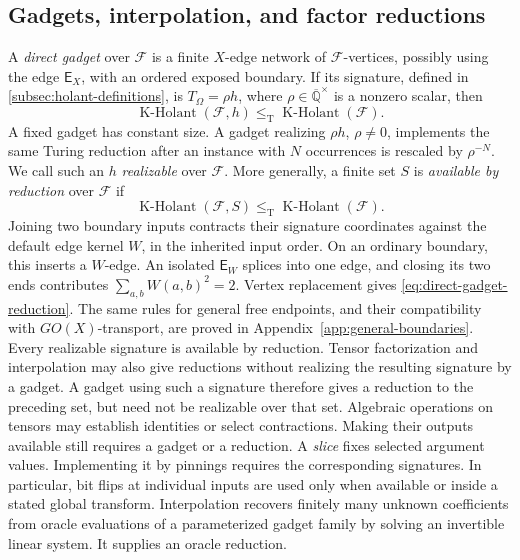 \documentclass[11pt,letterpaper,onecolumn]{article}
\theoremstyle{plain}
\theoremstyle{definition}
\theoremstyle{remark}
\newcommand{\AlgNums}{\overline{\mathbb Q}}
\newcommand{\cF}{\mathcal F}
\newcommand{\KHolant}{\operatorname{K\text{-}Holant}}
\newcommand{\leT}{\leq_{\mathrm T}}
\begin{document}
\subsection{Gadgets, interpolation, and factor reductions}
\label{subsec:reduction-conventions}

A \emph{direct gadget} over \(\cF\) is a finite \(X\)-edge network of
\(\cF\)-vertices, possibly using the edge \(\mathsf E_X\), with an
ordered exposed boundary. If its signature, defined in
\cref{subsec:holant-definitions}, is \(T_\Omega=\rho h\), where \(\rho\in\AlgNums^\times\) is a nonzero scalar, then
\begin{equation}
  \KHolant(\cF,h)
  \leT
  \KHolant(\cF).
  \label{eq:direct-gadget-reduction}
\end{equation}
A fixed gadget has constant size.  A gadget realizing \(\rho h\),
\(\rho\ne0\), implements the same Turing reduction after an instance with
\(N\) occurrences is rescaled by \(\rho^{-N}\).
We call such an \(h\) \emph{realizable} over \(\cF\).  More
generally, a finite set \(S\) is \emph{available by reduction} over
\(\cF\) if
\[
  \KHolant(\cF,S)\leT\KHolant(\cF).
\]
Joining two boundary inputs contracts their signature coordinates against
the default edge kernel \(W\), in the inherited input order. On an ordinary
boundary, this inserts a \(W\)-edge. An isolated \(\mathsf E_W\) splices
into one edge, and closing its two ends contributes
\(\sum_{a,b}W(a,b)^2=2\). Vertex replacement gives
\cref{eq:direct-gadget-reduction}.
The same rules for general free endpoints, and their compatibility with
\(GO(X)\)-transport, are proved in Appendix~\ref{app:general-boundaries}.
Every realizable signature is available by reduction.  Tensor factorization
and interpolation may also give reductions without realizing the resulting
signature by a gadget.  A gadget using such a signature therefore gives a
reduction to the preceding set, but need not be realizable over that set.
Algebraic operations on tensors may establish identities or select
contractions. Making their outputs available still requires a gadget or
a reduction. A \emph{slice} fixes selected argument values. Implementing
it by pinnings requires the corresponding signatures. In particular,
bit flips at individual inputs are used only when available or inside a
stated global transform. Interpolation recovers finitely many unknown
coefficients from oracle evaluations of a parameterized gadget family by
solving an invertible linear system. It supplies an oracle reduction.
\end{document}
